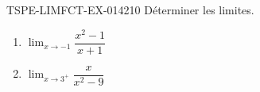 \begin{exercice}{TSPE-LIMFCT-EX-014}{2}{10}
Déterminer les limites.
\begin{enumerate}
  \item $\lim_{x \to -1} \dfrac{x^2 - 1}{x + 1}$
  \item $\lim_{x \to 3^+} \dfrac{x}{x^2 - 9}$
\end{enumerate}
\end{exercice}
